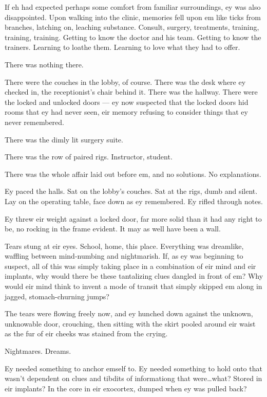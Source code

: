 If eh had expected perhaps some comfort from familiar surroundings, ey was also disappointed. Upon walking into the clinic, memories fell upon em like ticks from branches, latching on, leaching substance. Consult, surgery, treatments, training, training, training. Getting to know the doctor and his team. Getting to know the trainers. Learning to loathe them. Learning to love what they had to offer.

There was nothing there.

There were the couches in the lobby, of course. There was the desk where ey checked in, the receptionist's chair behind it. There was the hallway. There were the locked and unlocked doors --- ey now suspected that the locked doors hid rooms that ey had never seen, eir memory refusing to consider things that ey never remembered.

There was the dimly lit surgery suite.

There was the row of paired rigs. Instructor, student.

There was the whole affair laid out before em, and no solutions. No explanations.

Ey paced the halls. Sat on the lobby's couches. Sat at the rigs, dumb and silent. Lay on the operating table, face down as ey remembered. Ey rifled through notes.

Ey threw eir weight against a locked door, far more solid than it had any right to be, no rocking in the frame evident. It may as well have been a wall.

Tears stung at eir eyes. School, home, this place. Everything was dreamlike, waffling between mind-numbing and nightmarish. If, as ey was beginning to suspect, all of this was simply taking place in a combination of eir mind and eir implants, why would there be these tantalizing clues dangled in front of em? Why would eir mind think to invent a mode of transit that simply skipped em along in jagged, stomach-churning jumps?

The tears were flowing freely now, and ey hunched down against the unknown, unknowable door, crouching, then sitting with the skirt pooled around eir waist as the fur of eir cheeks was stained from the crying.

Nightmares. Dreams.

Ey needed something to anchor emself to. Ey needed something to hold onto that wasn't dependent on clues and tibdits of informationg that were\ldots{}what? Stored in eir implants? In the core in eir exocortex, dumped when ey was pulled back?

